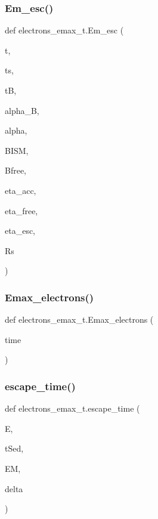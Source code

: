 \subsubsection{\texorpdfstring{Em\+\_\+esc()}{Em\_esc()}}
{\footnotesize\ttfamily def electrons\+\_\+emax\+\_\+t.\+Em\+\_\+esc (\begin{DoxyParamCaption}\item[{}]{t,  }\item[{}]{ts,  }\item[{}]{tB,  }\item[{}]{alpha\+\_\+B,  }\item[{}]{alpha,  }\item[{}]{B\+I\+SM,  }\item[{}]{Bfree,  }\item[{}]{eta\+\_\+acc,  }\item[{}]{eta\+\_\+free,  }\item[{}]{eta\+\_\+esc,  }\item[{}]{Rs }\end{DoxyParamCaption})}

\mbox{\label{namespaceelectrons__emax__t_a46d478aad7c92949d8617bac3e55ab9a}} 
\subsubsection{\texorpdfstring{Emax\+\_\+electrons()}{Emax\_electrons()}}
{\footnotesize\ttfamily def electrons\+\_\+emax\+\_\+t.\+Emax\+\_\+electrons (\begin{DoxyParamCaption}\item[{}]{time }\end{DoxyParamCaption})}

\mbox{\label{namespaceelectrons__emax__t_ac1f4ff8526d676dd17fa9096e04d5880}} 
\subsubsection{\texorpdfstring{escape\+\_\+time()}{escape\_time()}}
{\footnotesize\ttfamily def electrons\+\_\+emax\+\_\+t.\+escape\+\_\+time (\begin{DoxyParamCaption}\item[{}]{E,  }\item[{}]{t\+Sed,  }\item[{}]{EM,  }\item[{}]{delta }\end{DoxyParamCaption})}

